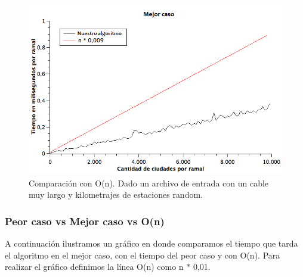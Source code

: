 \begin{figure}[H]
\begin{center}

  \includegraphics[width=\linewidth]{../graficos/ej1/MejorCaso.png}
  \caption{{\small Comparación con O(n). Dado un archivo de entrada con un cable muy largo y kilometrajes de estaciones random.}} \label{ej1-tiempo-vs-cant-ciudades-random-long-cable-largo}
\endminipage

\end{center}
\end{figure}

\subsubsection{Peor caso vs Mejor caso vs O(n)}

A continuación ilustramos un gráfico en donde comparamos el tiempo que tarda el algoritmo en el mejor caso, con el tiempo del peor caso y con O(n). Para realizar el gráfico definimos la línea O(n) como n $*$ 0,01.

